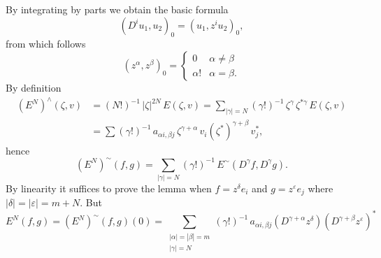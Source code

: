 By integrating by parts we obtain the basic formula
\[
(D^i u_1,u_2)_0=(u_1,z^i u_2)_0,
\]
from which follows
\[
(z^\alpha,z^\beta)_0=\begin{cases}0 & \alpha\neq\beta\\ \alpha! & \alpha=\beta.\end{cases}
\tag{3}
\]
By definition
\[
\begin{aligned}
(E^N)^\wedge(\zeta,v)&=(N!)^{-1}\,|\zeta|^{2N}\,E(\zeta,v)=\sum_{|\gamma|=N}(\gamma!)^{-1}\,\zeta^\gamma\,\zeta^{*\gamma}\,E(\zeta,v)\\
&=\sum(\gamma!)^{-1}\,a_{\alpha i,\beta j}\,\zeta^{\gamma+\alpha}\,v_i(\zeta^*)^{\gamma+\beta}\,v_j^*,
\end{aligned}
\]
hence
\[
(E^N)^\sim(f,g)=\sum_{|\gamma|=N}(\gamma!)^{-1}\,E^\sim(D^\gamma f,D^\gamma g).
\]
By linearity it suffices to prove the lemma when $f=z^\delta e_i$ and $g=z^\varepsilon e_j$
where $|\delta|=|\varepsilon|=m+N$. But
\[
E^N(f,g)=(E^N)^\sim(f,g)(0)=\sum_{\substack{|\alpha|=|\beta|=m\\ |\gamma|=N}}(\gamma!)^{-1}\,a_{\alpha i,\beta j}(D^{\gamma+\alpha}z^\delta)(D^{\gamma+\beta}z^\varepsilon)^*
\]

